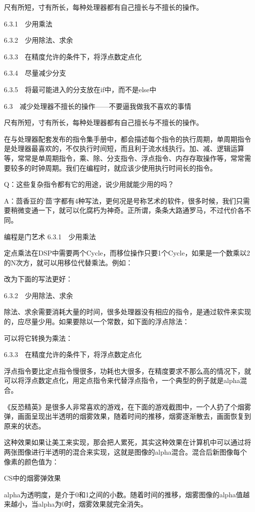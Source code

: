 \documentclass[12pt,UTF8]{ctexbook}
\begin{document}
尺有所短，寸有所长，每种处理器都有自己擅长与不擅长的操作。

6.3.1　少用乘法

6.3.2　少用除法、求余

6.3.3　在精度允许的条件下，将浮点数定点化

6.3.4　尽量减少分支

6.3.5　将最可能进入的分支放在if中，而不是else中


6.3　减少处理器不擅长的操作——不要逼我做我不喜欢的事情

尺有所短，寸有所长，每种处理器都有自己擅长与不擅长的操作。

在与处理器配套发布的指令集手册中，都会描述每个指令的执行周期，单周期指令是处理器最喜欢的，不仅执行时间短，而且利于流水线执行。加、减、逻辑运算等，常常是单周期指令，乘、除、分支指令、浮点指令、内存存取操作等，常常需要较多的时钟周期。我们在编程时，就应该少使用执行时间长的指令。

Q：这些复杂指令都有它的用途，说少用就能少用的吗？

A：茴香豆的‘茴’字都有4种写法，更何况是号称艺术的软件，很多时候，我们只需要稍微变通一下，就可以化腐朽为神奇。正所谓，条条大路通罗马，不过代价各不同。

编程是门艺术
6.3.1　少用乘法

定点乘法在DSP中需要两个Cycle，而移位操作只要1个Cycle，如果是一个数乘以2的N次方，就可以用移位代替乘法。例如：

改为下面的写法更好：

6.3.2　少用除法、求余

除法、求余需要消耗大量的时间，很多处理器没有相应的指令，是通过软件来实现的，应尽量少用。如果要除以一个常数，如下面的浮点除法：

可以将它转换为乘法：

6.3.3　在精度允许的条件下，将浮点数定点化

浮点指令要比定点指令慢很多，功耗也大很多，在精度要求不那么高的情况下，就可以将浮点数定点化，用定点指令来代替浮点指令，一个典型的例子就是alpha混合。

《反恐精英》是很多人非常喜欢的游戏，在下面的游戏截图中，一个人扔了个烟雾弹，画面呈现出半透明的烟雾效果，随着时间的推移，烟雾逐渐散去，画面恢复到原来的状态。

这种效果如果让美工来实现，那会把人累死，其实这种效果在计算机中可以通过将两张图像进行半透明的混合来实现，这就是图像的alpha混合。混合后新图像每个像素的颜色值为：

CS中的烟雾弹效果

alpha为透明度，是介于0和1之间的小数。随着时间的推移，烟雾图像的alpha值越来越小，当alpha为0时，烟雾效果就完全消失。
\end{document}
